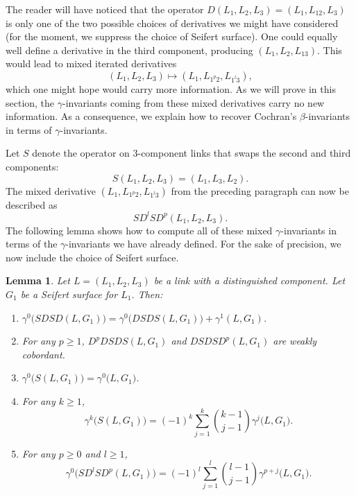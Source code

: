\documentclass[a4paper, 11pt]{amsart}
\newcommand{\red}{\textcolor{red}}
\newcommand{\chris}[1]{\red{[Chris] #1}}
\newtheorem{lemma}[theorem]{Lemma}
\theoremstyle{definition}
\newcommand{\Swap}{S}%
\newcommand{\swap}{\Swap}%
\begin{document}
The reader will have noticed that the operator $D(L_1, L_2, L_3)=(L_1, L_{12}, L_3)$ is only one of the two possible choices of derivatives we might have considered (for the moment, we suppress the choice of Seifert surface). One could equally well define a derivative in the third component, producing $(L_1, L_2, L_{13})$. This would lead to mixed iterated derivatives
\[
(L_1, L_2, L_3)\longmapsto (L_1, L_{1^{p}2}, L_{1^{l}3}),
\]
which one might hope would carry more information. As we will prove in this section, the $\gamma$-invariants coming from these mixed derivatives carry no new information.    As a consequence, we explain how to recover Cochran's $\beta$-invariants in terms of $\gamma$-invariants.  

Let $\swap$ denote the operator on $3$-component links that swaps the second and third components:
\[
\swap(L_1, L_2, L_3)=(L_1, L_3, L_2).
\]
The mixed derivative $(L_1, L_{1^{p}2}, L_{1^{l}3})$ from the preceding paragraph can now be described as
\[
\swap D^{l}  \swap  D^{p}(L_1, L_2, L_3).
\]
The following lemma shows how to compute all of these mixed $\gamma$-invariants in terms of the $\gamma$-invariants we have already defined. For the sake of precision, we now include the choice of Seifert surface.

   
\begin{lemma}\label{lem:swap}
Let $L=(L_1, L_2, L_3)$ be a link with a distinguished component. Let $G_1$ be a Seifert surface for $L_1$. Then: %
\begin{enumerate}
\item \label{item: DSDS vs SDSD} $\displaystyle
\gamma^0 \bigl( \Swap  D \Swap  D(L,G_1)\bigr)
=
\gamma^0  \bigl(D \Swap  D \Swap(L,G_1)\bigr)+\gamma^1(L,G_1)$.

\item \label{item: deriv commute} For any $p \geq 1$, $D^p D \Swap D \Swap(L,G_1)$ and $D \Swap D \Swap D^p(L,G_1)$ are weakly cobordant.

\item \label{item: gamma0 and S} $\displaystyle
\gamma^0 \bigl(\Swap(L,G_1)\bigr)=\gamma^0\bigl(L,G_1\bigr)$.

\item \label{item: gamma^k Swap} For any $k\ge 1$, $$
\gamma^k\bigl(\Swap(L,G_1)\bigr)
=
(-1)^k\sum_{j=1}^k {k-1 \choose j-1}\gamma^j\bigl(L,G_1\bigr).$$

\item \label{item: Mixed gammas} For any $p\ge 0$ and $l\ge 1$, $$
\gamma^0\bigl(\Swap D^l \Swap D^p(L,G_1)\bigr)
=
(-1)^l\sum_{j=1}^l {l-1 \choose j-1}\gamma^{p+j}\bigl(L,G_1\bigr).$$
\end{enumerate}
\end{lemma}
\end{document}
